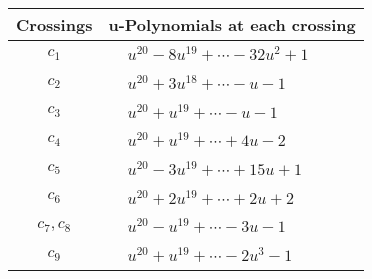 \documentclass[1p]{elsarticle_modified}
\theoremstyle{definition}
\begin{document}
\begin{tabular}{m{50pt}|m{274pt}}
Crossings & \hspace{64pt}u-Polynomials at each crossing \\
\hline $$\begin{aligned}c_{1}\end{aligned}$$&$\begin{aligned}
&u^{20}-8 u^{19}+\cdots-32 u^2+1
\end{aligned}$\\
\hline $$\begin{aligned}c_{2}\end{aligned}$$&$\begin{aligned}
&u^{20}+3 u^{18}+\cdots- u-1
\end{aligned}$\\
\hline $$\begin{aligned}c_{3}\end{aligned}$$&$\begin{aligned}
&u^{20}+u^{19}+\cdots- u-1
\end{aligned}$\\
\hline $$\begin{aligned}c_{4}\end{aligned}$$&$\begin{aligned}
&u^{20}+u^{19}+\cdots+4 u-2
\end{aligned}$\\
\hline $$\begin{aligned}c_{5}\end{aligned}$$&$\begin{aligned}
&u^{20}-3 u^{19}+\cdots+15 u+1
\end{aligned}$\\
\hline $$\begin{aligned}c_{6}\end{aligned}$$&$\begin{aligned}
&u^{20}+2 u^{19}+\cdots+2 u+2
\end{aligned}$\\
\hline $$\begin{aligned}c_{7},c_{8}\end{aligned}$$&$\begin{aligned}
&u^{20}- u^{19}+\cdots-3 u-1
\end{aligned}$\\
\hline $$\begin{aligned}c_{9}\end{aligned}$$&$\begin{aligned}
&u^{20}+u^{19}+\cdots-2 u^3-1
\end{aligned}$\\

\end{tabular}
\end{document}
